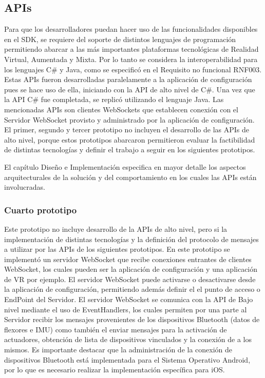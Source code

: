 \subsection{APIs}
Para que los desarrolladores puedan hacer uso de las funcionalidades disponibles en el SDK, se requiere del soporte de distintos lenguajes de programación permitiendo abarcar a las más importantes plataformas tecnológicas de Realidad Virtual, Aumentada y Mixta. Por lo tanto se considera la interoperabilidad para los lenguajes C\# y Java, como se especificó en el Requisito no funcional RNF003. Estas APIs fueron desarrolladas paralelamente a la aplicación de configuración pues se hace uso de ella, iniciando con la API de alto nivel de C\#. Una vez que la API C\# fue completada, se replicó utilizando el lenguaje Java. Las mencionadas APIs son clientes WebSockets que establecen conexión con el Servidor WebSocket provisto y administrado por la aplicación de configuración. El primer, segundo y tercer prototipo no incluyen el desarrollo de las APIs de alto nivel, porque estos prototipos abarcaron permitieron evaluar la factibilidad de distintas tecnologías y definir el trabajo a seguir en los siguientes prototipos.

El capítulo Diseño e Implementación especifica en mayor detalle los aspectos arquitecturales  de la solución y del comportamiento en los cuales las APIs están involucradas.

\subsubsection{Cuarto prototipo}
Este prototipo no incluye desarrollo de la APIs de alto nivel, pero si la implementación de distintas tecnologías y la definición del protocolo de mensajes a utilizar por las APIs de los siguientes prototipos. En este prototipo se implementó un servidor WebSocket que recibe conexiones entrantes de clientes WebSocket, los cuales pueden ser la aplicación de configuración y una aplicación de VR por ejemplo. El servidor WebSocket puede activarse o desactivarse desde la aplicación de configuración, permitiendo además definir el el punto de acceso o EndPoint del Servidor. El servidor WebSocket se comunica con la API de Bajo nivel mediante el uso de EventHandlers, los cuales permiten por una parte al Servidor recibir los mensajes provenientes de los dispositivos Bluetooth (datos de flexores e IMU) como también el enviar mensajes para la activación de actuadores, obtención de lista de dispositivos vinculados y la conexión de a los mismos. Es importante destacar que la administración de la conexión de dispositivos Bluetooth está implementada para el Sistema Operativo Android, por lo que es necesario realizar la implementación específica para iOS.
	
